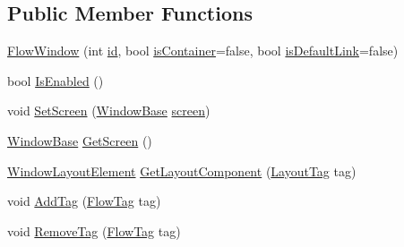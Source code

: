 \subsection*{Public Member Functions}
\begin{DoxyCompactItemize}
\item 
\hyperlink{class_unity_engine_1_1_u_i_1_1_windows_1_1_plugins_1_1_flow_1_1_flow_window_ac4bfe7477e76f2ab63e3ca91f3f6f565}{Flow\+Window} (int \hyperlink{class_unity_engine_1_1_u_i_1_1_windows_1_1_plugins_1_1_flow_1_1_flow_window_aa104f440272c2c98112523a60b9f9426}{id}, bool \hyperlink{class_unity_engine_1_1_u_i_1_1_windows_1_1_plugins_1_1_flow_1_1_flow_window_a33d93fedb381d32058ee8d85407b2073}{is\+Container}=false, bool \hyperlink{class_unity_engine_1_1_u_i_1_1_windows_1_1_plugins_1_1_flow_1_1_flow_window_afed737450825dc96a5eb695c3777f8c7}{is\+Default\+Link}=false)
\item 
bool \hyperlink{class_unity_engine_1_1_u_i_1_1_windows_1_1_plugins_1_1_flow_1_1_flow_window_a81335a6f9543ee07677afb8b1779480a}{Is\+Enabled} ()
\item 
void \hyperlink{class_unity_engine_1_1_u_i_1_1_windows_1_1_plugins_1_1_flow_1_1_flow_window_acd8bf953c7ebf3063370acd2c05140d4}{Set\+Screen} (\hyperlink{class_unity_engine_1_1_u_i_1_1_windows_1_1_window_base}{Window\+Base} \hyperlink{class_unity_engine_1_1_u_i_1_1_windows_1_1_plugins_1_1_flow_1_1_flow_window_a112a7288a0d2ab66cf632937c34684ff}{screen})
\item 
\hyperlink{class_unity_engine_1_1_u_i_1_1_windows_1_1_window_base}{Window\+Base} \hyperlink{class_unity_engine_1_1_u_i_1_1_windows_1_1_plugins_1_1_flow_1_1_flow_window_a06c1745ce26ab31de76d9a98637300ee}{Get\+Screen} ()
\item 
\hyperlink{class_unity_engine_1_1_u_i_1_1_windows_1_1_window_layout_element}{Window\+Layout\+Element} \hyperlink{class_unity_engine_1_1_u_i_1_1_windows_1_1_plugins_1_1_flow_1_1_flow_window_a0f7177e16855ce9ed0b256c7ccc2309c}{Get\+Layout\+Component} (\hyperlink{namespace_unity_engine_1_1_u_i_1_1_windows_a954ff5db0de6295464f3b95598158333}{Layout\+Tag} tag)
\item 
void \hyperlink{class_unity_engine_1_1_u_i_1_1_windows_1_1_plugins_1_1_flow_1_1_flow_window_afdcf7698415d777df05c1dd718d2a751}{Add\+Tag} (\hyperlink{class_unity_engine_1_1_u_i_1_1_windows_1_1_plugins_1_1_flow_1_1_flow_tag}{Flow\+Tag} tag)
\item 
void \hyperlink{class_unity_engine_1_1_u_i_1_1_windows_1_1_plugins_1_1_flow_1_1_flow_window_abe7777050d86d78097cc61daebf16c30}{Remove\+Tag} (\hyperlink{class_unity_engine_1_1_u_i_1_1_windows_1_1_plugins_1_1_flow_1_1_flow_tag}{Flow\+Tag} tag)

\end{DoxyCompactItemize}
